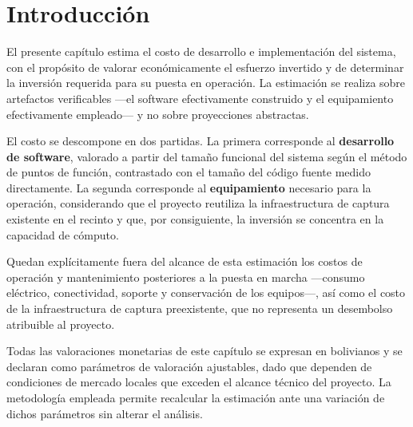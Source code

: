 \section{Introducción}

El presente capítulo estima el costo de desarrollo e implementación del sistema,
con el propósito de valorar económicamente el esfuerzo invertido y de determinar
la inversión requerida para su puesta en operación. La estimación se realiza
sobre artefactos verificables ---el software efectivamente construido y el
equipamiento efectivamente empleado--- y no sobre proyecciones abstractas.

El costo se descompone en dos partidas. La primera corresponde al
\textbf{desarrollo de software}, valorado a partir del tamaño funcional del
sistema según el método de puntos de función, contrastado con el tamaño del
código fuente medido directamente. La segunda corresponde al
\textbf{equipamiento} necesario para la operación, considerando que el proyecto
reutiliza la infraestructura de captura existente en el recinto y que, por
consiguiente, la inversión se concentra en la capacidad de cómputo.

Quedan explícitamente fuera del alcance de esta estimación los costos de
operación y mantenimiento posteriores a la puesta en marcha ---consumo
eléctrico, conectividad, soporte y conservación de los equipos---, así como el
costo de la infraestructura de captura preexistente, que no representa un
desembolso atribuible al proyecto.

Todas las valoraciones monetarias de este capítulo se expresan en bolivianos y
se declaran como parámetros de valoración ajustables, dado que dependen de
condiciones de mercado locales que exceden el alcance técnico del proyecto. La
metodología empleada permite recalcular la estimación ante una variación de
dichos parámetros sin alterar el análisis.
